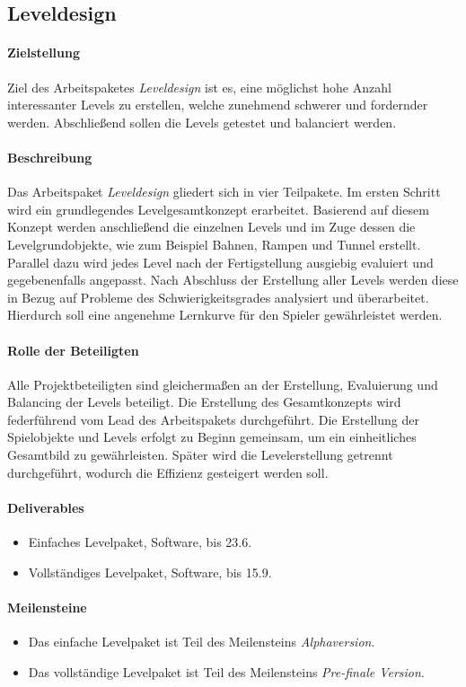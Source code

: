 \subsection{Leveldesign}

\paragraph{Zielstellung}\noindent
Ziel des Arbeitspaketes \textit{Leveldesign} ist es, eine möglichst hohe Anzahl interessanter Levels zu erstellen, welche zunehmend schwerer und fordernder werden. Abschließend sollen die Levels getestet und balanciert werden.

\paragraph{Beschreibung}\noindent
Das Arbeitspaket \textit{Leveldesign} gliedert sich in vier Teilpakete. Im ersten Schritt wird ein grundlegendes Levelgesamtkonzept erarbeitet. Basierend auf diesem Konzept werden anschließend die einzelnen Levels und im Zuge dessen die Levelgrundobjekte, wie zum Beispiel Bahnen, Rampen und Tunnel erstellt. Parallel dazu wird jedes Level nach der Fertigstellung ausgiebig evaluiert und gegebenenfalls angepasst. Nach Abschluss der Erstellung aller Levels werden diese in Bezug auf Probleme des Schwierigkeitsgrades analysiert und überarbeitet. Hierdurch soll eine angenehme Lernkurve für den Spieler gewährleistet werden.

\paragraph{Rolle der Beteiligten}\noindent
Alle Projektbeteiligten sind gleichermaßen an der Erstellung, Evaluierung und Balancing der Levels beteiligt. Die Erstellung des Gesamtkonzepts wird federführend vom Lead des Arbeitspakets durchgeführt. Die Erstellung der Spielobjekte und Levels erfolgt zu Beginn gemeinsam, um ein einheitliches Gesamtbild zu gewährleisten. Später wird die Levelerstellung getrennt durchgeführt, wodurch die Effizienz gesteigert werden soll.

\paragraph{Deliverables}\noindent
\begin{itemize}
\item Einfaches Levelpaket, Software, bis 23.6.
\item Vollständiges Levelpaket, Software, bis 15.9.
\end{itemize}

\paragraph{Meilensteine}\noindent
\begin{itemize}
\item Das einfache Levelpaket ist Teil des Meilensteins \textit{Alphaversion}.
\item Das vollständige Levelpaket ist Teil des Meilensteins \textit{Pre-finale Version}.
\end{itemize}